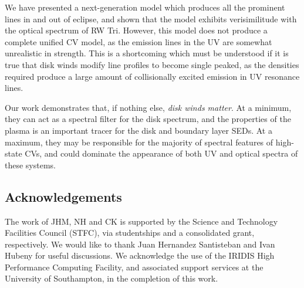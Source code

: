 \documentclass[preprint, a4paper, 11pt]{aastex}
\begin{document}
\smallskip
We have presented a next-generation model
which produces all the prominent lines in and out of eclipse, and
shown that the model exhibits verisimilitude with the optical spectrum of RW Tri.
However, this model does not produce a complete unified CV model, as
the emission lines in the UV are somewhat unrealistic in strength.
This is a shortcoming which must be understood if it is true that
disk winds modify line profiles to become single peaked, as the 
densities required produce a large amount of collisionally excited emission
in UV resonance lines.

Our work demonstrates that, if nothing else,
{\sl disk winds matter}. At a minimum,
they can act as a spectral filter
for the disk spectrum, and the properties of the plasma
is an important tracer for the disk and boundary layer SEDs. 
At a maximum, they may be responsible
for the majority of spectral features of high-state CVs,
and could dominate the appearance of both UV and optical
spectra of these systems.











\subsection*{Acknowledgements}
The work of JHM, NH and CK is supported by the Science and Technology Facilities Council (STFC), 
via studentships and a consolidated grant, respectively. We would like to thank Juan Hernandez Santisteban and Ivan Hubeny 
for useful discussions. We acknowledge the use of the IRIDIS High Performance Computing Facility, 
and associated support services at the University of Southampton, in the completion of this work.


\newpage
\newpage

\end{document}
